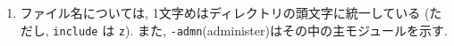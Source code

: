 \begin{enumerate}
\item ファイル名については, 
  1文字めはディレクトリの頭文字に統一している
  (ただし, {\tt include} は {\tt z}).
  また, {\tt -admn\/}(administer)はその中の主モジュールを示す.

\end{enumerate}

